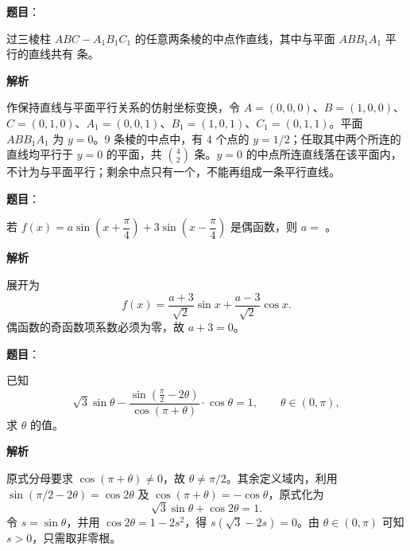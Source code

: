 \begin{answer}

\textbf{题目}：

过三棱柱 $ABC-A_1B_1C_1$ 的任意两条棱的中点作直线，其中与平面 $ABB_1A_1$ 平行的直线共有 \gkblank{} 条。

\textbf{解析}

作保持直线与平面平行关系的仿射坐标变换，令 $A=(0,0,0)$、$B=(1,0,0)$、$C=(0,1,0)$、$A_1=(0,0,1)$、$B_1=(1,0,1)$、$C_1=(0,1,1)$。平面 $ABB_1A_1$ 为 $y=0$。9 条棱的中点中，有 4 个点的 $y=1/2$；任取其中两个所连的直线均平行于 $y=0$ 的平面，共 $\binom42$ 条。$y=0$ 的中点所连直线落在该平面内，不计为与平面平行；剩余中点只有一个，不能再组成一条平行直线。


\end{answer}
\begin{answer}

\textbf{题目}：

若 $f(x)=a\sin\left(x+\dfrac{\pi}{4}\right)+3\sin\left(x-\dfrac{\pi}{4}\right)$ 是偶函数，则 $a=$ \gkblank{}。

\textbf{解析}

展开为
\nopagebreak[4]
\[
f(x)=\frac{a+3}{\sqrt2}\sin x+\frac{a-3}{\sqrt2}\cos x.
\]
偶函数的奇函数项系数必须为零，故 $a+3=0$。


\end{answer}
\begin{answer}

\textbf{题目}：

已知
\nopagebreak[4]
\[
\sqrt3\sin\theta-\frac{\sin\left(\frac{\pi}{2}-2\theta\right)}{\cos(\pi+\theta)}\cdot\cos\theta=1,\qquad \theta\in(0,\pi),
\]
求 $\theta$ 的值。

\textbf{解析}

原式分母要求 $\cos(\pi+\theta)\ne0$，故 $\theta\ne\pi/2$。其余定义域内，利用 $\sin(\pi/2-2\theta)=\cos2\theta$ 及 $\cos(\pi+\theta)=-\cos\theta$，原式化为
\nopagebreak[4]
\[
\sqrt3\sin\theta+\cos2\theta=1.
\]
令 $s=\sin\theta$，并用 $\cos2\theta=1-2s^2$，得 $s(\sqrt3-2s)=0$。由 $\theta\in(0,\pi)$ 可知 $s>0$，只需取非零根。


\end{answer}

